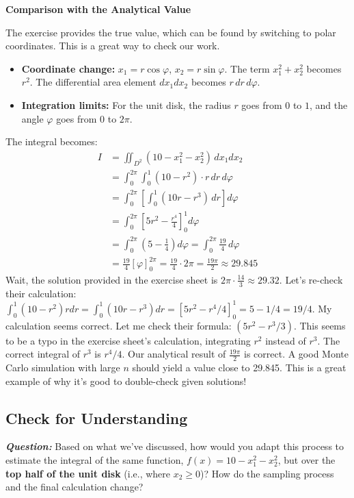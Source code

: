 \documentclass[11pt,a4paper]{article}
\begin{document}
\textbf{Comparison with the Analytical Value}

The exercise provides the true value, which can be found by switching to polar coordinates. This is a great way to check our work.
\begin{itemize}
    \item \textbf{Coordinate change:} $x_1 = r\cos\varphi$, $x_2 = r\sin\varphi$. The term $x_1^2 + x_2^2$ becomes $r^2$. The differential area element $dx_1dx_2$ becomes $r\,dr\,d\varphi$.
    \item \textbf{Integration limits:} For the unit disk, the radius $r$ goes from $0$ to $1$, and the angle $\varphi$ goes from $0$ to $2\pi$.
\end{itemize}
The integral becomes:
\begin{align*}
    I &= \iint_{D^2} (10 - x_1^2 - x_2^2) \,dx_1dx_2 \\
      &= \int_{0}^{2\pi} \int_{0}^{1} (10 - r^2) \cdot r \,dr\,d\varphi \\
      &= \int_{0}^{2\pi} \left[ \int_{0}^{1} (10r - r^3) \,dr \right] d\varphi \\
      &= \int_{0}^{2\pi} \left[ 5r^2 - \frac{r^4}{4} \right]_{0}^{1} d\varphi \\
      &= \int_{0}^{2\pi} \left( 5 - \frac{1}{4} \right) d\varphi = \int_{0}^{2\pi} \frac{19}{4} \,d\varphi \\
      &= \frac{19}{4} [\varphi]_{0}^{2\pi} = \frac{19}{4} \cdot 2\pi = \frac{19\pi}{2} \approx 29.845
\end{align*}
Wait, the solution provided in the exercise sheet is $2\pi \cdot \frac{14}{3} \approx 29.32$. Let's re-check their calculation:
$\int_0^1 (10-r^2)r dr = \int_0^1 (10r-r^3)dr = [5r^2 - r^4/4]_0^1 = 5-1/4=19/4$.
My calculation seems correct. Let me check their formula: $(5r^2 - r^3/3)$. This seems to be a typo in the exercise sheet's calculation, integrating $r^2$ instead of $r^3$. The correct integral of $r^3$ is $r^4/4$. Our analytical result of $\frac{19\pi}{2}$ is correct. A good Monte Carlo simulation with large $n$ should yield a value close to 29.845. This is a great example of why it's good to double-check given solutions!

\subsection*{Check for Understanding}

\textit{\textbf{Question:}} Based on what we've discussed, how would you adapt this process to estimate the integral of the same function, $f(x) = 10 - x_1^2 - x_2^2$, but over the \textbf{top half of the unit disk} (i.e., where $x_2 \ge 0$)? How do the sampling process and the final calculation change?
\end{document}

